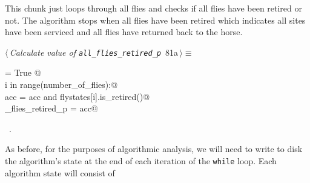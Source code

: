\documentclass[11.5pt]{report}
\begin{document}
\vspace{-0.8cm} \newchunk This chunk just loops through all flies and checks if all flies have been retired or not. 
The algorithm stops when all flies have been retired which indicates all sites have been serviced and all flies have 
returned back to the horse.
\begin{flushleft} \small
\begin{minipage}{\linewidth}\label{scrap127}\raggedright\small
{} $\langle\,${\itshape Calculate value of \verb|all_flies_retired_p|}\nobreak\ {\footnotesize {81a}}$\,\rangle\equiv$
\vspace{-1ex}
\begin{list}{}{} \item
\mbox{}\verb@acc = True @\\
\mbox{}\verb@for i in range(number_of_flies):@\\
\mbox{}\verb@     acc = acc and flystates[i].is_retired()@\\
\mbox{}\verb@all_flies_retired_p = acc@\\
\mbox{}\verb@@{\NWsep}
\end{list}
\vspace{-1.5ex}
\footnotesize
\begin{list}{}{\setlength{\itemsep}{-\parsep}\setlength{\itemindent}{-\leftmargin}}
\item \NWtxtMacroRefIn\ .

\item{}
\end{list}
\end{minipage}\vspace{4ex}
\end{flushleft}

\vspace{-0.8cm}\newchunk As before, for the purposes of algorithmic analysis, we will need to write to disk 
the algorithm's state at the end of each iteration of the \verb|while| loop. Each algorithm 
state will consist of 
\end{document}
